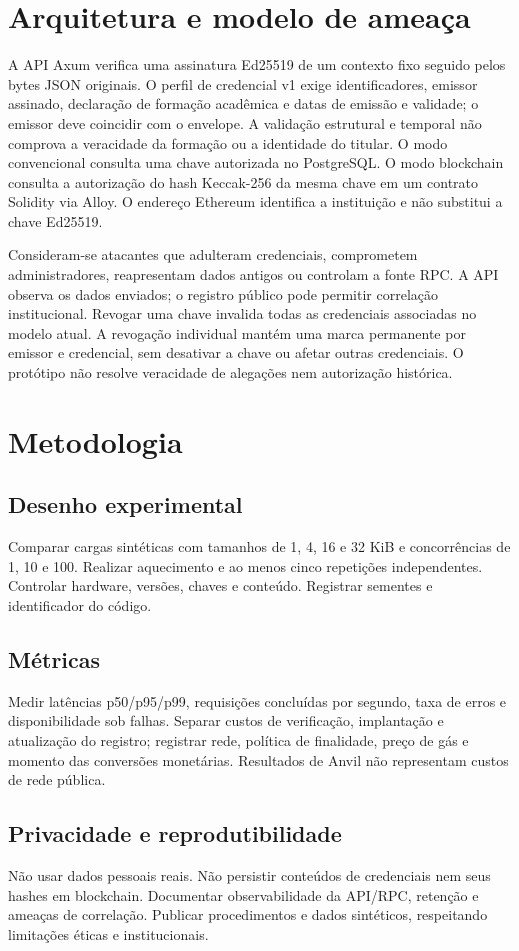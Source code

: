 \documentclass[12pt,a4paper,oneside]{report}
\begin{document}
\chapter{Arquitetura e modelo de ameaça}
A API Axum verifica uma assinatura Ed25519 de um contexto fixo seguido pelos bytes JSON originais. O perfil de credencial v1 exige identificadores, emissor assinado, declaração de formação acadêmica e datas de emissão e validade; o emissor deve coincidir com o envelope. A validação estrutural e temporal não comprova a veracidade da formação ou a identidade do titular. O modo convencional consulta uma chave autorizada no PostgreSQL. O modo blockchain consulta a autorização do hash Keccak-256 da mesma chave em um contrato Solidity via Alloy. O endereço Ethereum identifica a instituição e não substitui a chave Ed25519.

Consideram-se atacantes que adulteram credenciais, comprometem administradores, reapresentam dados antigos ou controlam a fonte RPC. A API observa os dados enviados; o registro público pode permitir correlação institucional. Revogar uma chave invalida todas as credenciais associadas no modelo atual. A revogação individual mantém uma marca permanente por emissor e credencial, sem desativar a chave ou afetar outras credenciais. O protótipo não resolve veracidade de alegações nem autorização histórica.
\chapter{Metodologia}
\section{Desenho experimental}
Comparar cargas sintéticas com tamanhos de 1, 4, 16 e 32 KiB e concorrências de 1, 10 e 100. Realizar aquecimento e ao menos cinco repetições independentes. Controlar hardware, versões, chaves e conteúdo. Registrar sementes e identificador do código.
\section{Métricas}
Medir latências p50/p95/p99, requisições concluídas por segundo, taxa de erros e disponibilidade sob falhas. Separar custos de verificação, implantação e atualização do registro; registrar rede, política de finalidade, preço de gás e momento das conversões monetárias. Resultados de Anvil não representam custos de rede pública.
\section{Privacidade e reprodutibilidade}
Não usar dados pessoais reais. Não persistir conteúdos de credenciais nem seus hashes em blockchain. Documentar observabilidade da API/RPC, retenção e ameaças de correlação. Publicar procedimentos e dados sintéticos, respeitando limitações éticas e institucionais.
\end{document}

